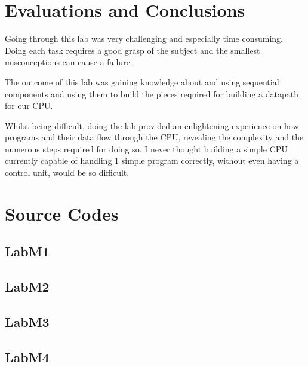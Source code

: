 \documentclass{article}
\begin{document}
\section{Evaluations and Conclusions}

Going through this lab was very challenging and especially time consuming.
Doing each task requires a good grasp of the subject and the smallest misconceptions
can cause a failure. \newline

The outcome of this lab was gaining knowledge about and using sequential
components and using them to build the pieces required for building a datapath
for our CPU. \newline

Whilst being difficult, doing the lab provided an enlightening experience on
how programs and their data flow through the CPU, revealing the complexity and
the numerous steps required for doing so. I never thought building a simple CPU
currently capable of handling 1 simple program correctly, without even having
a control unit, would be so difficult.


\section{Source Codes}

\subsection{LabM1}


\subsection{LabM2}


\subsection{LabM3}


\subsection{LabM4}

\end{document}
